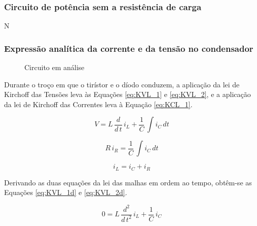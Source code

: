 \documentclass[a4paper,11pt]{article}
\numberwithin{equation}{section}
\begin{document}
\subsubsection{Circuito de potência sem a resistência de carga}

N

\subsubsection{Expressão analítica da corrente e da tensão no condensador}


	\begin{figure}[h]
		\centering

		\caption{Circuito em análise}
		\label{fig:circuit_e18}
	\end{figure}

Durante o troço em que o tirístor e o díodo conduzem, a aplicação da lei de Kirchoff das Tensões leva às Equações \ref{eq:KVL_1} e \ref{eq:KVL_2}, e a aplicação da lei de Kirchoff das Correntes leva à Equação \ref{eq:KCL_1}.

\begin{equation}
\label{eq:KVL_1}
V = L\,\frac{d}{d\,t}\,i_L + \frac{1}{C}\,\int i_C\,dt
\end{equation}

\begin{equation}
\label{eq:KVL_2}
R\,i_R = \frac{1}{C}\,\int i_C\,dt
\end{equation}

\begin{equation}
\label{eq:KCL_1}
i_L = i_C + i_R
\end{equation}

Derivando as duas equações da lei das malhas em ordem ao tempo, obtêm-se as Equações \ref{eq:KVL_1d} e \ref{eq:KVL_2d}.

\begin{equation}
\label{eq:KVL_1d}
0 = L\,\frac{d^2}{d\,t^2}\,i_L + \frac{1}{C}\,i_C
\end{equation}
\end{document}
